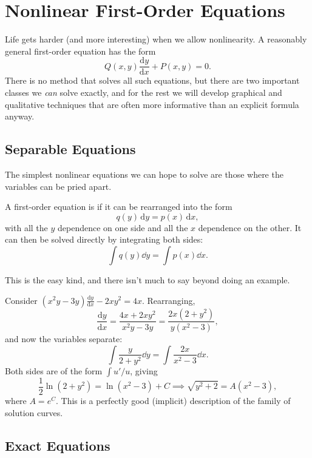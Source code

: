 \documentclass[a4paper]{scrartcl}
\begin{document}
\section{Nonlinear First-Order Equations}

Life gets harder (and more interesting) when we allow nonlinearity. A reasonably general first-order equation has the form
$$
Q(x, y) \frac{\mathrm{d}y}{\mathrm{d}x} + P(x, y) = 0.
$$
There is no method that solves all such equations, but there are two important classes we \emph{can} solve exactly, and for the rest we will develop graphical and qualitative techniques that are often more informative than an explicit formula anyway.

\subsection{Separable Equations}

The simplest nonlinear equations we can hope to solve are those where the variables can be pried apart.

\begin{definition}
	A first-order equation is  if it can be rearranged into the form
	$$
	q(y) \, \mathrm{d}y = p(x) \, \mathrm{d}x,
	$$
	with all the $y$ dependence on one side and all the $x$ dependence on the other. It can then be solved directly by integrating both sides:
	$$
	\int q(y) \dd y = \int p(x) \dd x.
	$$
\end{definition}

This is the easy kind, and there isn't much to say beyond doing an example.

\begin{example}
	Consider $(x^2 y - 3y) \frac{\mathrm{d}y}{\mathrm{d}x} - 2xy^2 = 4x$. Rearranging,
	$$
	\frac{\mathrm{d}y}{\mathrm{d}x} = \frac{4x + 2xy^2}{x^2 y - 3y} = \frac{2x (2 + y^2)}{y (x^2 - 3)},
	$$
	and now the variables separate:
	$$
	\int \frac{y}{2 + y^2} \dd y = \int \frac{2x}{x^2 - 3} \dd x.
	$$
	Both sides are of the form $\int u'/u$, giving
	$$
	\frac{1}{2}\ln (2 + y^2) = \ln (x^2 - 3) + C \implies \sqrt{y^2 + 2} = A(x^2 - 3),
	$$
	where $A = e^C$. This is a perfectly good (implicit) description of the family of solution curves.
\end{example}

\subsection{Exact Equations}
\end{document}
